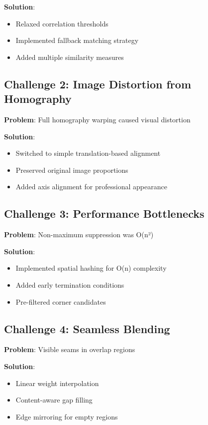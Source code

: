 \documentclass[12pt,a4paper]{article}
\begin{document}
\textbf{Solution}: 
\begin{itemize}
    \item Relaxed correlation thresholds
    \item Implemented fallback matching strategy
    \item Added multiple similarity measures
\end{itemize}

\subsection{Challenge 2: Image Distortion from Homography}
\textbf{Problem}: Full homography warping caused visual distortion

\textbf{Solution}:
\begin{itemize}
    \item Switched to simple translation-based alignment
    \item Preserved original image proportions
    \item Added axis alignment for professional appearance
\end{itemize}

\subsection{Challenge 3: Performance Bottlenecks}
\textbf{Problem}: Non-maximum suppression was O(n²)

\textbf{Solution}:
\begin{itemize}
    \item Implemented spatial hashing for O(n) complexity
    \item Added early termination conditions
    \item Pre-filtered corner candidates
\end{itemize}

\subsection{Challenge 4: Seamless Blending}
\textbf{Problem}: Visible seams in overlap regions

\textbf{Solution}:
\begin{itemize}
    \item Linear weight interpolation
    \item Content-aware gap filling
    \item Edge mirroring for empty regions
\end{itemize}
\end{document}
